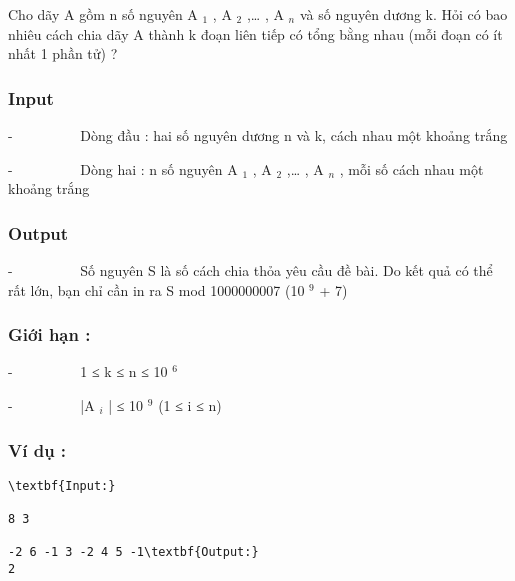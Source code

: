 



   Cho dãy A gồm n số nguyên A   $_    1   $   , A   $_    2   $   ,… , A   $_    n   $   và số nguyên dương k. Hỏi có bao nhiêu cách chia dãy A thành k đoạn liên tiếp có tổng bằng nhau (mỗi đoạn có ít nhất 1 phần tử) ?  

\subsubsection{   Input  }

   -          Dòng đầu : hai số nguyên dương n và k, cách nhau một khoảng trắng  

   -          Dòng hai : n số nguyên A   $_    1   $   , A   $_    2   $   ,… , A   $_    n   $   , mỗi số cách nhau một khoảng trắng  

\subsubsection{   Output  }

   -          Số nguyên S là số cách chia thỏa yêu cầu đề bài. Do kết quả có thể rất lớn, bạn chỉ cần in ra S mod 1000000007 (10   $^    9   $   + 7)  

\subsubsection{   Giới hạn :  }

   -          1 ≤ k ≤ n ≤ 10   $^    6   $

   -          |A   $_    i   $   | ≤ 10   $^    9   $   (1 ≤ i ≤ n)  

\subsubsection{   Ví dụ :  }
\begin{verbatim}
\textbf{Input:}

8 3

-2 6 -1 3 -2 4 5 -1\textbf{Output:}
2\end{verbatim}